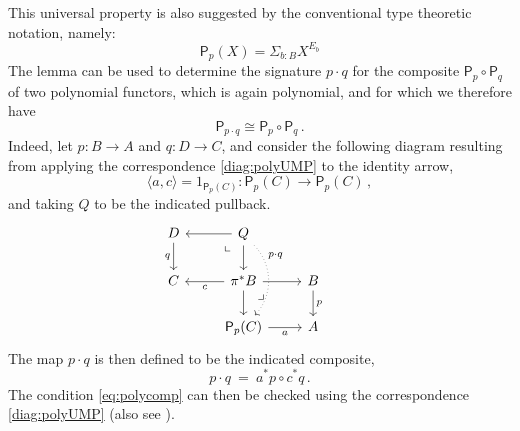 \documentclass[12pt,reqno]{amsart}
\newcommand{\alg}[1]{\ensuremath{\mathsf{#1}}}
\renewcommand{\to}{\ensuremath{\rightarrow}}
\newcommand{\pbcorner}{\arrow[dr,phantom,"\lrcorner" very near start, shift right=.5ex]} %
\newcommand{\pbcornerright}{\arrow[dl,phantom,"\llcorner" very near start, shift left=.5ex]} %
\theoremstyle{remark}
\theoremstyle{definition}
\begin{document}
This universal property is also suggested by the conventional type theoretic notation, namely: $$\alg{P}_p (X) = \Sigma_{b:B} X^{E_b}$$
The lemma can be used to determine the signature $p\cdot q$ for the composite $\alg{P}_p \circ \alg{P}_q$ of two polynomial functors, which is again polynomial, and for which we therefore have
\begin{equation}\label{eq:polycomp}
\alg{P}_{p\cdot q} \cong \alg{P}_p \circ \alg{P}_q\,.
\end{equation}
Indeed, let $p : B \to A$ and $q : D \to C$, and consider the following diagram resulting from applying the correspondence \eqref{diag:polyUMP} to the identity arrow,
\[
\langle a, c\rangle = 1_{\alg{P}_p(C)} : \alg{P}_p(C) \to \alg{P}_p(C)\,,
\]
and taking $Q$ to be the indicated pullback.
%
\begin{equation}\label{diag:polyUMP}
\begin{tikzcd}
D \ar[d,swap,"q"] & \ar[l] Q \ar[d] \pbcornerright  \ar[dd, dotted, bend left = 10ex ,near start, "{p\cdot q}"]& & \\
 C  & \ar[l,"c"] \pi^*B \ar[d] \ar[r] \pbcorner & B \ar[d,"p"] \\
&  \alg{P}_p(C) \ar[r,swap,"a"] & A
\end{tikzcd}
\end{equation}
The map $p\cdot q$ is then defined to be the indicated composite,
\[
p\cdot q\ =\ a^*p \circ c^*q\,.
\]
The condition \eqref{eq:polycomp} can then be checked using the correspondence \eqref{diag:polyUMP} (also see \cite{GambinoKoch}).
\end{document}
